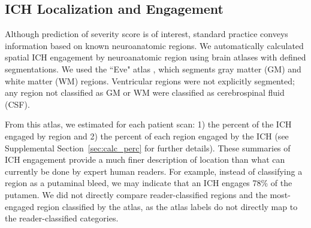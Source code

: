\documentclass[10pt]{article}\usepackage[]{graphicx}\usepackage[]{color}
\begin{document}
\subsection{ICH Localization and Engagement}
\label{sec:engage}
Although prediction of severity score is of interest, standard practice conveys information based on known neuroanatomic regions.  We automatically calculated spatial ICH engagement by neuroanatomic region using brain atlases with defined segmentations.  
We used the ``Eve" atlas \citep{oishi_human_2008}, which segments  gray matter (GM) and white matter (WM) regions.  
Ventricular regions were not explicitly segmented; any region not classified as GM or WM were classified as cerebrospinal fluid (CSF).

From this atlas, we 
estimated for each patient scan: 1) the percent of the ICH engaged by region and 2) the percent of each region engaged by the ICH (see Supplemental Section~\ref{sec:calc_perc} for further details).
These summaries of ICH engagement provide a much finer description of location than what can currently be done by expert human readers.  For example, instead of classifying a region as a putaminal bleed, we may indicate that an ICH engages 78\% of the putamen.  We did not directly compare reader-classified regions and the most-engaged region classified by the atlas, as the atlas labels do not directly map to the reader-classified categories.
\end{document}
